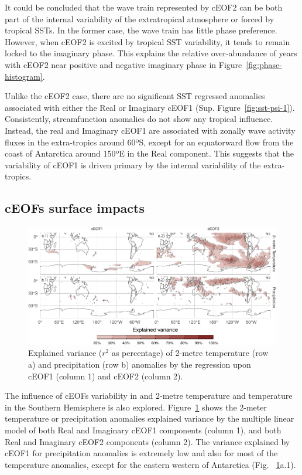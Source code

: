 \documentclass[smallextended]{svjour3}       %
\begin{document}
It could be concluded that the wave train represented by cEOF2 can be both part of the internal variability of the extratropical atmosphere or forced by tropical SSTs.
In the former case, the wave train has little phase preference.
However, when cEOF2 is excited by tropical SST variability, it tends to remain locked to the imaginary phase.
This explains the relative over-abundance of years with cEOF2 near positive and negative imaginary phase in Figure~\ref{fig:phase-histogram}.

Unlike the cEOF2 case, there are no significant SST regressed anomalies associated with either the Real or Imaginary cEOF1 (Sup. Figure~\ref{fig:sst-psi-1}).
Consistently, streamfunction anomalies do not show any tropical influence.
Instead, the real and Imaginary cEOF1 are associated with zonally wave activity fluxes in the extra-tropics around 60ºS, except for an equatorward flow from the coast of Antarctica around 150ºE in the Real component.
This suggests that the variability of cEOF1 is driven primary by the internal variability of the extra-tropics.

\hypertarget{precipitation}{%
\subsection{cEOFs surface impacts}\label{precipitation}}

\begin{figure}
\centering
\includegraphics{../figures/pp-t2m-r2-1.pdf}
\caption{\label{fig:pp-t2m-r2}Explained variance (\(r^2\) as percentage) of 2-metre temperature (row a) and precipitation (row b) anomalies by the regression upon cEOF1 (column 1) and cEOF2 (column 2).}
\end{figure}



The influence of cEOFs variability in and 2-metre temperature and temperature in the Southern Hemisphere is also explored.
Figure~\ref{fig:pp-t2m-r2} shows the 2-meter temperature or precipitation anomalies explained variance by the multiple linear model of both Real and Imaginary cEOF1 components (column 1), and both Real and Imaginary cEOF2 components (column 2).
The variance explained by cEOF1 for precipitation anomalies is extremely low and also for most of the temperature anomalies, except for the eastern western of Antarctica (Fig.~ \ref{fig:pp-t2m-r2}a.1).
\end{document}
